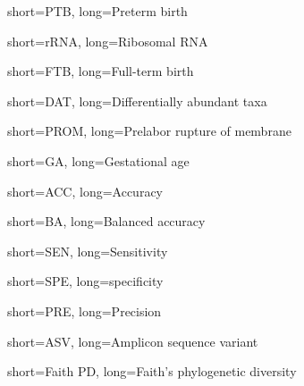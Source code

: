 {
    short=PTB,
    long=Preterm birth
}

{
    short=rRNA,
    long=Ribosomal RNA
}

{
    short=FTB,
    long=Full-term birth
}

{
    short=DAT,
    long=Differentially abundant taxa
}

{
    short=PROM,
    long=Prelabor rupture of membrane
}

{
    short=GA,
    long=Gestational age
}

{
    short=ACC,
    long=Accuracy
}

{
    short=BA,
    long=Balanced accuracy
}

{
    short=SEN,
    long=Sensitivity
}

{
    short=SPE,
    long=specificity
}

{
    short=PRE,
    long=Precision
}

{
    short=ASV,
    long=Amplicon sequence variant
}

{
    short=Faith PD,
    long=Faith's phylogenetic diversity
}


